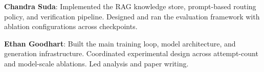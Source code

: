 \documentclass[11pt]{article}
\begin{document}
\textbf{Chandra Suda}: Implemented the RAG knowledge store, prompt-based routing policy, and verification pipeline. Designed and ran the evaluation framework with ablation configurations across checkpoints.

\textbf{Ethan Goodhart}: Built the main training loop, model architecture, and generation infrastructure. Coordinated experimental design across attempt-count and model-scale ablations. Led analysis and paper writing.



\end{document}
